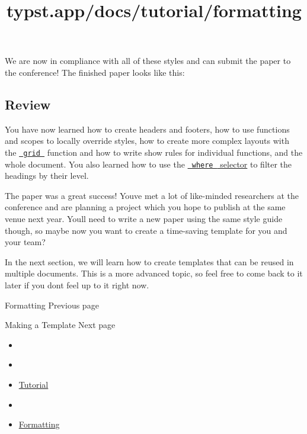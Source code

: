 We are now in compliance with all of these styles and can submit the
paper to the conference! The finished paper looks like this:


\subsection{Review}\label{review}

You have now learned how to create headers and footers, how to use
functions and scopes to locally override styles, how to create more
complex layouts with the
\href{/docs/reference/layout/grid/}{\texttt{\ grid\ }} function and how
to write show rules for individual functions, and the whole document.
You also learned how to use the
\href{/docs/reference/styling/\#show-rules}{\texttt{\ where\ } selector}
to filter the headings by their level.

The paper was a great success! You\textquotesingle ve met a lot of
like-minded researchers at the conference and are planning a project
which you hope to publish at the same venue next year.
You\textquotesingle ll need to write a new paper using the same style
guide though, so maybe now you want to create a time-saving template for
you and your team?

In the next section, we will learn how to create templates that can be
reused in multiple documents. This is a more advanced topic, so feel
free to come back to it later if you don\textquotesingle t feel up to it
right now.

\href{/docs/tutorial/formatting/}{\pandocbounded{}}

{ Formatting } { Previous page }

\href{/docs/tutorial/making-a-template/}{\pandocbounded{}}

{ Making a Template } { Next page }


\title{typst.app/docs/tutorial/formatting}

\begin{itemize}
\tightlist
\item
  \href{/docs}{}
\item
  
\item
  \href{/docs/tutorial/}{Tutorial}
\item
  
\item
  \href{/docs/tutorial/formatting/}{Formatting}
\end{itemize}

